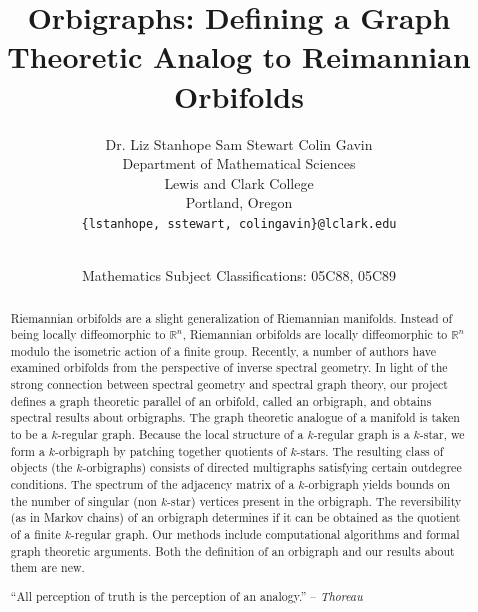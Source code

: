 \documentclass[12pt]{article}
\title{\bf Orbigraphs: Defining a Graph Theoretic Analog to Reimannian Orbifolds}
\author{Dr. Liz Stanhope \qquad Sam Stewart \qquad  Colin Gavin\\
\small Department of Mathematical Sciences\\[-0.8ex]
\small Lewis and Clark College\\[-0.8ex] 
\small Portland, Oregon\\
\small\tt \{lstanhope, sstewart, colingavin\}@lclark.edu\\
}
\date{\dateline{XX}{XX}\\
\small Mathematics Subject Classifications: 05C88, 05C89}
\theoremstyle{plain}
\theoremstyle{definition}
\theoremstyle{remark}
\begin{document}
\maketitle


\begin{abstract}
Riemannian orbifolds are a slight generalization of Riemannian manifolds.  Instead of being locally diffeomorphic to $\mathbb{R}^n$, Riemannian orbifolds are locally diffeomorphic to $\mathbb{R}^n$ modulo the isometric action of a finite group.  Recently, a number of authors have examined orbifolds from the perspective of inverse spectral geometry.  In light of the strong connection between spectral geometry and spectral graph theory, our project defines a graph theoretic parallel of an orbifold, called an orbigraph, and obtains spectral results about orbigraphs.  The graph theoretic analogue of a manifold is taken to be a $k$-regular graph.  Because the local structure of a $k$-regular graph is a $k$-star, we form a $k$-orbigraph by patching together quotients of $k$-stars.  The resulting class of objects (the $k$-orbigraphs) consists of directed multigraphs satisfying certain outdegree conditions.  The spectrum of the adjacency matrix of a $k$-orbigraph yields bounds on the number of singular (non $k$-star) vertices present in the orbigraph.  The reversibility (as in Markov chains) of an orbigraph determines if it can be obtained as the quotient of a finite $k$-regular graph.  Our methods include computational algorithms and formal graph theoretic arguments.  Both the definition of an orbigraph and our results about them are new.

  \bigskip\noindent ``All perception of truth is the perception of an analogy.'' -- \textit{Thoreau}

\end{abstract}
\end{document}
